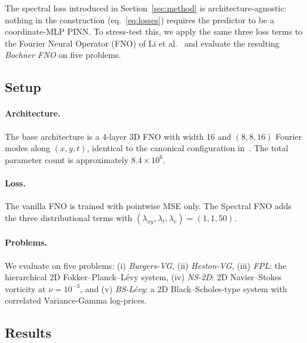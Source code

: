 \documentclass[review,12pt]{elsarticle}
\begin{document}
The spectral loss introduced in Section~\ref{sec:method} is
architecture-agnostic: nothing in the construction
(eq.~\ref{eq:losses}) requires the predictor to be a coordinate-MLP
PINN. To stress-test this, we apply the same three loss terms to
the Fourier Neural Operator (FNO) of Li et al.~\cite{Li2021FNO}
and evaluate the resulting \emph{Bochner FNO} on five problems.

\subsection{Setup}
\label{subsec:fno-setup}

\paragraph{Architecture.}
The base architecture is a 4-layer 3D FNO with width 16 and
$(8, 8, 16)$ Fourier modes along $(x, y, t)$, identical to the
canonical configuration in~\cite{Li2021FNO}. The total parameter
count is approximately $8.4 \times 10^{6}$.

\paragraph{Loss.}
The vanilla FNO is trained with pointwise MSE only. The Spectral
FNO adds the three distributional terms with
$(\lambda_{xy}, \lambda_{t}, \lambda_{v}) = (1, 1, 50)$.

\paragraph{Problems.}
We evaluate on five problems:
(i) \emph{Burgers-VG}, (ii) \emph{Heston-VG},
(iii) \emph{FPL}: the hierarchical 2D Fokker--Planck--L\'evy system,
(iv) \emph{NS-2D}: 2D Navier--Stokes vorticity at $\nu = 10^{-3}$,
and (v) \emph{BS-L\'evy}: a 2D Black--Scholes-type system with
correlated Variance-Gamma log-prices.

\subsection{Results}
\label{subsec:fno-results}
\end{document}

